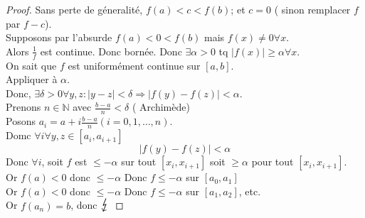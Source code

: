 \documentclass[../main.tex]{subfiles}
\begin{document}
\begin{proof}
	Sans perte de géneralité, $f( a) < c < f( b) $; et $c=0$ ( sinon remplacer $f$ par $f-c$).\\
	Supposons par l'absurde $f( a) <0 < f( b) $ mais $f( x) \neq 0 \forall x$.\\
	Alors $\frac{1}{f}$ est continue. Donc bornée. Donc $\exists \alpha> 0$ tq $|f( x) | \geq \alpha \forall x$.\\
	On sait que $f$ est uniformément continue sur $[a,b]$.\\
	Appliquer à $\alpha$.\\
	Donc, $\exists \delta> 0 \forall y,z: |y-z| < \delta \Rightarrow |f( y) - f( z) | < \alpha$.\\
	Prenons $n \in \mathbb{N}$ avec $\frac{b-a}{n} < \delta$ ( Archimède) \\
	Posons $a_i = a+ i \frac{b-a}{n} ( i=0,1, \ldots, n) $.\\
	Domc $\forall i \forall y, z \in [ a_i, a_{i+1} ] $ 
	\[ 
		|f( y) - f( z) | < \alpha
	\]
	Donc $\forall i$, soit $f$ est $\leq - \alpha$ sur tout $[x_i, x_{i+1}] $ soit $\geq \alpha$ pour tout $[x_i, x_{i+1} ]$.\\

	Or $f( a) < 0$ donc $\leq -\alpha$ Donc $f\leq - \alpha$ sur $[a_0,a_1]$ \\
	Or $f( a) < 0$ donc $\leq -\alpha$ Donc $f\leq - \alpha$ sur $[a_1,a_2]$, etc.\\
	Or $f( a_n) =b$, donc $\contra$

\end{proof}
\end{document}
